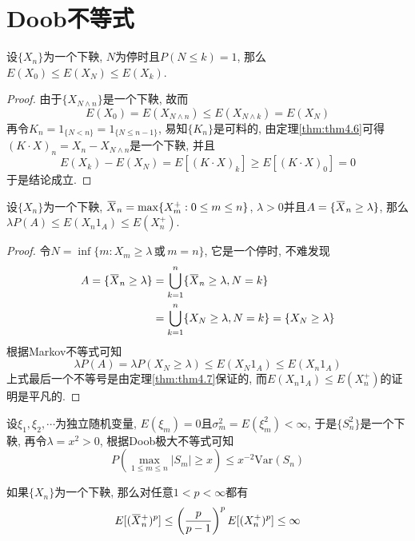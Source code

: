 \documentclass[cn, 12pt, math=mtpro2, bibstyle=apa, blue, twocol]{elegantbook}
\newcommand{\var}{\text{Var}}
\newcommand{\overbar}[1]{\mkern 1.5mu\overline{\mkern-1.5mu#1\mkern-1.5mu}\mkern 1.5mu}
\begin{document}
\section{Doob不等式}
\begin{theorem}\label{thm:thm4.7}
  设$\{X_n\}$为一个下鞅, $N$为停时且$P(N\leq k)=1$, 那么$E(X_0)\leq E(X_N)\leq E(X_k)$.
\end{theorem}
\begin{proof}
  由于$\{X_{N\wedge n}\}$是一个下鞅, 故而
  $$E(X_0)=E(X_{N\wedge n})\leq E(X_{N\wedge k})=E(X_N)$$
  再令$K_n=1_{\{N<n\}}=1_{\{N\le n-1\}}$, 易知$\{K_n\}$是可料的, 由定理\ref{thm:thm4.6}可得$(K\cdot X)_n=X_n-X_{N\wedge n}$是一个下鞅, 并且
  $$E(X_k)-E(X_N)=E[(K\cdot X)_k]\geq E[(K\cdot X)_0]=0$$
  于是结论成立.
\end{proof}
\begin{theorem}[Doob极大不等式]
  设$\{X_n\}$为一个下鞅, $\overbar{X}_n=\max\{X_m^+: 0\leq m\leq n\}$, $\lambda>0$并且$A=\{\overbar{X}_n\geq \lambda\}$, 那么$\lambda P(A)\leq E(X_n1_A)\leq E(X_n^+)$.
\end{theorem}
\begin{proof}
  令$N=\inf\{m:X_m\ge\lambda\,\text{或}\,m=n\}$, 它是一个停时, 不难发现
  \begin{align*}
  A=\{\overbar{X}_n\ge\lambda\}&=\bigcup_{k=1}^n\{\overbar{X}_n\ge\lambda, N=k\} \\
  &=\bigcup_{k=1}^n\{X_N\ge\lambda, N=k\}=\{X_N\ge\lambda\}
  \end{align*}
  根据Markov不等式可知
  $$\lambda P(A)=\lambda P(X_N\ge\lambda)\leq E(X_N1_A)\leq E(X_n1_A)$$
  上式最后一个不等号是由定理\ref{thm:thm4.7}保证的, 而$E(X_n1_A)\leq E(X_n^+)$的证明是平凡的.
\end{proof}
\begin{example}[$\,$Kolmogorov极大不等式]
设$\xi_1,\xi_2,\cdots$为独立随机变量, $E(\xi_m)=0$且$\sigma_m^2=E(\xi_m^2)<\infty$, 于是$\{S_n^2\}$是一个下鞅, 再令$\lambda=x^2>0$, 根据Doob极大不等式可知
$$P\left(\max_{1\leq m\leq n}|S_m|\geq x\right)\leq x^{-2}\var(S_n)$$
\end{example}
\begin{theorem}[$L^p$极大不等式]
  如果$\{X_n\}$为一个下鞅, 那么对任意$1<p<\infty$都有
  $$E[(\overbar{X}_n^+)^p]\leq \left(\frac{p}{p-1}\right)^pE[(X_n^+)^p]\leq\infty$$
\end{theorem}
\end{document}
